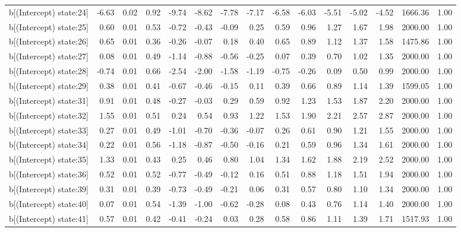 \begin{table}[ht]
\begin{tabular}{rrrrrrrrrrrrrrr}
  b[(Intercept) state:24] & -6.63 & 0.02 & 0.92 & -9.74 & -8.62 & -7.78 & -7.17 & -6.58 & -6.03 & -5.51 & -5.02 & -4.52 & 1666.36 & 1.00 \\ 
  b[(Intercept) state:25] & 0.60 & 0.01 & 0.53 & -0.72 & -0.43 & -0.09 & 0.25 & 0.59 & 0.96 & 1.27 & 1.67 & 1.98 & 2000.00 & 1.00 \\ 
  b[(Intercept) state:26] & 0.65 & 0.01 & 0.36 & -0.26 & -0.07 & 0.18 & 0.40 & 0.65 & 0.89 & 1.12 & 1.37 & 1.58 & 1475.86 & 1.00 \\ 
  b[(Intercept) state:27] & 0.08 & 0.01 & 0.49 & -1.14 & -0.88 & -0.56 & -0.25 & 0.07 & 0.39 & 0.70 & 1.02 & 1.35 & 2000.00 & 1.00 \\ 
  b[(Intercept) state:28] & -0.74 & 0.01 & 0.66 & -2.54 & -2.00 & -1.58 & -1.19 & -0.75 & -0.26 & 0.09 & 0.50 & 0.99 & 2000.00 & 1.00 \\ 
  b[(Intercept) state:29] & 0.38 & 0.01 & 0.41 & -0.67 & -0.46 & -0.15 & 0.11 & 0.39 & 0.66 & 0.89 & 1.14 & 1.39 & 1599.05 & 1.00 \\ 
  b[(Intercept) state:31] & 0.91 & 0.01 & 0.48 & -0.27 & -0.03 & 0.29 & 0.59 & 0.92 & 1.23 & 1.53 & 1.87 & 2.20 & 2000.00 & 1.00 \\ 
  b[(Intercept) state:32] & 1.55 & 0.01 & 0.51 & 0.24 & 0.54 & 0.93 & 1.22 & 1.53 & 1.90 & 2.21 & 2.57 & 2.87 & 2000.00 & 1.00 \\ 
  b[(Intercept) state:33] & 0.27 & 0.01 & 0.49 & -1.01 & -0.70 & -0.36 & -0.07 & 0.26 & 0.61 & 0.90 & 1.21 & 1.55 & 2000.00 & 1.00 \\ 
  b[(Intercept) state:34] & 0.22 & 0.01 & 0.56 & -1.18 & -0.87 & -0.50 & -0.16 & 0.21 & 0.59 & 0.96 & 1.34 & 1.61 & 2000.00 & 1.00 \\ 
  b[(Intercept) state:35] & 1.33 & 0.01 & 0.43 & 0.25 & 0.46 & 0.80 & 1.04 & 1.34 & 1.62 & 1.88 & 2.19 & 2.52 & 2000.00 & 1.00 \\ 
  b[(Intercept) state:36] & 0.52 & 0.01 & 0.52 & -0.77 & -0.49 & -0.12 & 0.16 & 0.51 & 0.88 & 1.18 & 1.51 & 1.94 & 2000.00 & 1.00 \\ 
  b[(Intercept) state:39] & 0.31 & 0.01 & 0.39 & -0.73 & -0.49 & -0.21 & 0.06 & 0.31 & 0.57 & 0.80 & 1.10 & 1.34 & 2000.00 & 1.00 \\ 
  b[(Intercept) state:40] & 0.07 & 0.01 & 0.54 & -1.39 & -1.00 & -0.62 & -0.28 & 0.08 & 0.43 & 0.76 & 1.14 & 1.40 & 2000.00 & 1.00 \\ 
  b[(Intercept) state:41] & 0.57 & 0.01 & 0.42 & -0.41 & -0.24 & 0.03 & 0.28 & 0.58 & 0.86 & 1.11 & 1.39 & 1.71 & 1517.93 & 1.00 \\ 

\end{tabular}
\end{table}
